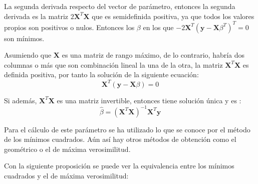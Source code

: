 \noindent La segunda derivada respecto del vector de parámetro, entonces la segunda derivada es la matriz $2\mathbf{X}^T\mathbf{X}$ que es semidefinida positiva, ya que todos los valores propios son positivos o nulos. Entonces los $\beta$ en los que $-2\mathbf{X}^T(\mathbf{y}-\mathbf{X}\beta^T)^T=0$ son mínimos.  

\noindent Asumiendo que $\textbf{X}$ es una matriz de rango máximo, de lo contrario, habría dos columnas o más que son combinación lineal la una de la otra, la matriz $\textbf{X}^T\textbf{X}$ es definida positiva, por tanto la solución de la siguiente ecuación:
\begin{equation}
\textbf{X}^T(\textbf{y}-\textbf{X}\beta)=0
\end{equation}

\noindent Si además, $\textbf{X}^T\textbf{X}$ es una matriz invertible, entonces tiene solución única y es :
\begin{equation}
\hat{\beta}=(\textbf{X}^T\textbf{X})^{-1}\textbf{X}^T\textbf{y}
\end{equation}

\noindent Para el cálculo de este parámetro se ha utilizado lo que se conoce por el método de los mínimos cuadrados. Aún así hay otros métodos de obtención como el geométrico o el de máxima verosimilitud. 

\noindent Con la siguiente proposición se puede ver la equivalencia entre los mínimos cuadrados y el de máxima verosimilitud:

